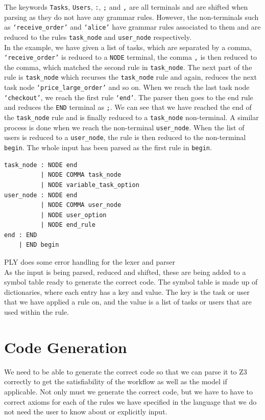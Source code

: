\documentclass[a4paper]{report}
\begin{document}
The keywords \texttt{Tasks}, \texttt{Users}, \texttt{:}, \texttt{;} and \texttt{,} are all terminals and are shifted when parsing as they do not have any grammar rules. However, the non-terminals such as \texttt{`receive\_order'} and \texttt{`alice'} have grammar rules associated to them and are reduced to the rules \texttt{task\_node} and \texttt{user\_node} respectively. \\

In the example, we have given a list of tasks, which are separated by a comma, \texttt{`receive\_order'} is reduced to a \texttt{NODE} terminal, the comma \texttt{,} is then reduced to the comma, which matched the second rule in \texttt{task\_node}. The next part of the rule is \texttt{task\_node} which recurses the \texttt{task\_node} rule and again, reduces the next task node \texttt{`price\_large\_order'} and so on. When we reach the last task node \texttt{`checkout'}, we reach the first rule \texttt{`end'}. The parser then goes to the end rule and reduces the \texttt{END} terminal as \texttt{;}. We can see that we have reached the end of the \texttt{task\_node} rule and is finally reduced to a \texttt{task\_node} non-terminal. A similar process is done when we reach the non-terminal \texttt{user\_node}. When the list of users is reduced to a \texttt{user\_node}, the rule is then reduced to the non-terminal \texttt{begin}. The whole input has been parsed as the first rule in \texttt{begin}.
\begin{lstlisting}[frame=single]
task_node : NODE end
          | NODE COMMA task_node
          | NODE variable_task_option
user_node : NODE end
          | NODE COMMA user_node
          | NODE user_option
          | NODE end_rule
end : END
    | END begin
\end{lstlisting}

PLY does some error handling for the lexer and parser\\

As the input is being parsed, reduced and shifted, these are being added to a symbol table ready to generate the correct code. The symbol table is made up of dictionaries, where each entry has a key and value. The key is the task or user that we have applied a rule on, and the value is a list of tasks or users that are used within the rule. \\

\section{Code Generation}
We need to be able to generate the correct code so that we can parse it to Z3 correctly to get the satisfiability of the workflow as well as the model if applicable. Not only must we generate the correct code, but we have to have to correct axioms for each of the rules we have specified in the language that we do not need the user to know about or explicitly input.\\
\end{document}
